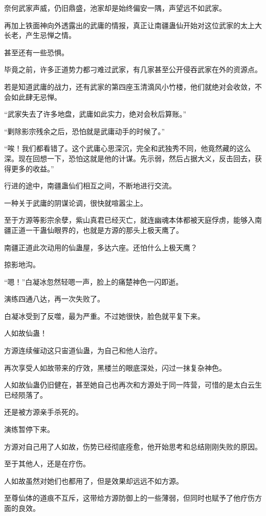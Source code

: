 \begin{this_body}
奈何武家声威，仍旧鼎盛，池家却是始终偏安一隅，声望远不如武家。

再加上铁面神向外透露出的武庸的情报，真正让南疆蛊仙开始对这位武家的太上大长老，产生忌惮之情。

甚至还有一些恐惧。

毕竟之前，许多正道势力都刁难过武家，有几家甚至公开侵吞武家在外的资源点。

若是知道武庸的战力，还有武家的第四座玉清滴风小竹楼，他们就绝对会收敛，不会如此肆无忌惮。

“武家失去了许多地盘，武庸如此实力，绝对会秋后算账。”

“剿除影宗残余之后，恐怕就是武庸动手的时候了。”

“唉！我们都看错了。这个武庸心思深沉，完全和武独秀不同，他竟然藏的这么深。现在回想一下，恐怕这就是他的计谋。先示弱，然后占据大义，反击回去，获得更多的收益。”

行进的途中，南疆蛊仙们相互之间，不断地进行交流。

一种关于武庸的阴谋论调，很快就喧嚣尘上。

至于方源等影宗余孽，紫山真君已经灭亡，就连幽魂本体都被天庭俘虏，能够入南疆正道一干蛊仙眼界的，也就是方源的那头上极天鹰了。

南疆正道此次动用的仙蛊屋，多达六座。还怕什么上极天鹰？

掠影地沟。

“嗯！”白凝冰忽然轻嗯一声，脸上的痛楚神色一闪即逝。

演练四通八达，再一次失败了。

白凝冰受到了反噬，最为严重。不过她很快，脸色就平复下来。

人如故仙蛊！

方源连续催动这只宙道仙蛊，为自己和他人治疗。

再次享受人如故带来的疗效，黑楼兰的眼底深处，闪过一抹复杂神色。

人如故仙蛊仍旧健在，甚至她自己也再次和方源处于同一阵营，可惜的是太白云生已经陨落了。

还是被方源亲手杀死的。

演练暂停下来。

方源对自己用了人如故，伤势已经彻底痊愈，他开始思考和总结刚刚失败的原因。

至于其他人，还是在疗伤。

人如故虽然对她们也都用了，但是效果却远远不如方源。

至尊仙体的道痕不互斥，这带给方源防御上的一些薄弱，但同时也赋予了他疗伤方面的良效。


\end{this_body}
